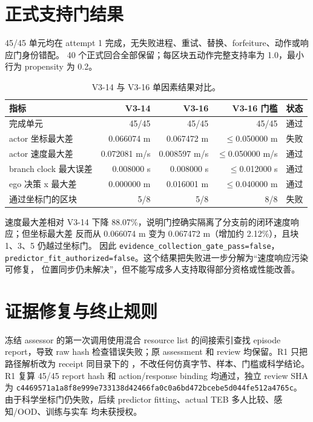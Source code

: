 \documentclass[12pt,a4paper,oneside]{report}
\newcommand{\ok}{\textcolor{vgreen}{通过}}
\newcommand{\fail}{\textcolor{vred}{失败}}
\newcommand{\code}[1]{\texttt{#1}}
\newcommand{\hashbreak}[4]{\texttt{\footnotesize #1\allowbreak#2\allowbreak#3\allowbreak#4}}
\begin{document}
\section{正式支持门结果}
45/45 单元均在 attempt 1 完成，无失败进程、重试、替换、forfeiture、动作或响应门身份错配。
40 个正式回合全部保留；每区块五动作完整支持率为 1.0，最小行为 propensity 为 0.2。

\begin{table}[htbp]
\centering
\caption{V3-14 与 V3-16 单因素结果对比。}
\begin{tabular}{lrrrl}
\toprule
指标 & V3-14 & V3-16 & V3-16 门槛 & 状态\\
\midrule
完成单元 & 45/45 & 45/45 & 45/45 & \ok\\
actor 坐标最大差 & 0.066074 m & 0.067472 m & $\leq$0.050000 m & \fail\\
actor 速度最大差 & 0.072081 m/s & 0.008597 m/s & $\leq$0.050000 m/s & \ok\\
branch clock 最大误差 & 0.008000 s & 0.008000 s & $\leq$0.012000 s & \ok\\
ego 决策 x 最大差 & 0.000000 m & 0.016001 m & $\leq$0.040000 m & \ok\\
通过坐标门的区块 & 5/8 & 5/8 & 8/8 & \fail\\
\bottomrule
\end{tabular}
\label{tab:v316}
\end{table}

速度最大差相对 V3-14 下降 88.07\%，说明门控确实隔离了分支前的闭环速度响应；但坐标最大差
反而从 0.066074 m 变为 0.067472 m（增加约 2.12\%），且块 1、3、5 仍越过坐标门。
因此 \code{evidence\_collection\_gate\_pass=false}，
\code{predictor\_fit\_authorized=false}。这个结果把失败进一步分解为“速度响应污染可修复，
位置同步仍未解决”，但不能写成多人支持取得部分资格或性能改善。

\section{证据修复与终止规则}
冻结 assessor 的第一次调用使用混合 resource list 的间接索引查找 episode report，导致 raw hash
检查错误失败；原 assessment 和 review 均保留。R1 只把路径解析改为 receipt 同目录下的
，不改任何仿真字节、样本、门槛或科学结论。R1 复算 45/45 report
hash 和 action/response binding 均通过，独立 review SHA 为
\hashbreak{c4469571a1a8f8e9}{99e733138d42466f}{a0c0a6bd472bcebe}{5d044fe512a4765c}。
由于科学坐标门仍失败，后续 predictor fitting、actual TEB 多人比较、感知/OOD、训练与实车
均未获授权。
\end{document}
